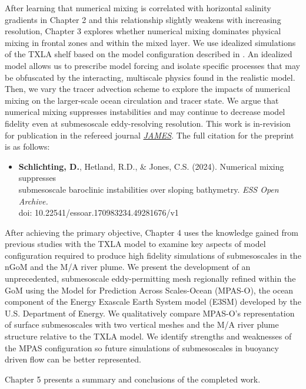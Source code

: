 After learning that numerical mixing is correlated with horizontal salinity gradients in Chapter 2 and this relationship slightly weakens with increasing resolution, Chapter 3 explores whether numerical mixing dominates physical mixing in frontal zones and within the mixed layer. We use idealized simulations of the TXLA shelf based on the model configuration described in \cite{Hetland_2017}. An idealized model allows us to prescribe model forcing and isolate specific processes that may be obfuscated by the interacting, multiscale physics found in the realistic model. Then, we vary the tracer advection scheme to explore the impacts of numerical mixing on the larger-scale ocean circulation and tracer state. We argue that numerical mixing suppresses instabilities and may continue to decrease model fidelity even at submesoscale eddy-resolving resolution. This work is in-revision for publication in the refereed journal \href{https://essopenarchive.org/users/750365/articles/722044-numerical-mixing-suppresses-submesoscale-baroclinic-instabilities-over-sloping-bathymetry}{\textit{JAMES}}. The full citation for the preprint is as follows:
\begin{itemize}
    \item[] \textbf{Schlichting, D.}, Hetland, R.D., \& Jones, C.S. (2024). Numerical mixing suppresses \\
    \hspace{\labelwidth} submesoscale baroclinic instabilities over sloping bathymetry. \textit{ESS Open Archive.}\\ 
        \hspace{\labelwidth} doi: 10.22541/essoar.170983234.49281676/v1
\end{itemize}

After achieving the primary objective, Chapter 4 uses the knowledge gained from previous studies with the TXLA model to examine key aspects of model configuration required to produce high fidelity simulations of submesoscales in the nGoM and the M/A river plume. We present the development of an unprecedented, submesoscale eddy-permitting mesh regionally refined within the GoM using the Model for Prediction Across Scales-Ocean (MPAS-O), the ocean component of the Energy Exascale Earth System model (E3SM) developed by the U.S. Department of Energy. We qualitatively compare MPAS-O's representation of surface submesoscales with two vertical meshes and the M/A river plume structure relative to the TXLA model. We identify strengths and weaknesses of the MPAS configuration so future simulations of submesoscales in buoyancy driven flow can be better represented. 

Chapter 5 presents a summary and conclusions of the completed work. 

